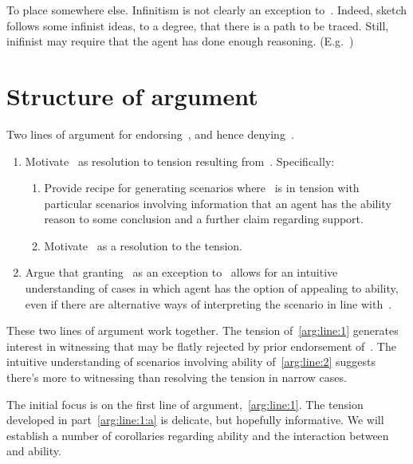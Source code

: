 \begin{note}
  {
    \color{red}
    To place somewhere else.
  }
  Infinitism is not clearly an exception to~\uRa{}.
  Indeed, sketch follows some infinist ideas, to a degree, that there is a path to be traced.
  Still, inifinist may require that the agent has done enough reasoning.
  (E.g.\ \textcite[10]{Klein:2007ve})
\end{note}

\newpage

\section{Structure of argument}
\label{sec:structure-argument}

\begin{note}
  Two lines of argument for endorsing~\rC{}, and hence denying~\uRa{}.
  \begin{enumerate}[label=(L\arabic*), ref=(L\arabic*)]
  \item\label{arg:line:1} Motivate~\rC{} as resolution to tension resulting from~\uRa{}.\newline
    Specifically:
    \begin{enumerate}[label=(L1\alph*)]
    \item\label{arg:line:1:a} Provide recipe for generating scenarios where~\uRa{} is in tension with particular scenarios involving information that an agent has the ability reason to some conclusion and a further claim regarding support.
    \item\label{arg:line:1:b} Motivate~\rC{} as a resolution to the tension.
    \end{enumerate}
  \item\label{arg:line:2} Argue that granting~\rC{} as an exception to~\uRa{} allows for an intuitive understanding of cases in which agent has the option of appealing to ability, even if there are alternative ways of interpreting the scenario in line with~\uRa{}.
  \end{enumerate}
  These two lines of argument work together.
  The tension of~\ref{arg:line:1} generates interest in witnessing that may be flatly rejected by prior endorsement of~\uRa{}.
  The intuitive understanding of scenarios involving ability of~\ref{arg:line:2} suggests there's more to witnessing than resolving the tension in narrow cases.
\end{note}

\begin{note}
  The initial focus is on the first line of argument,~\ref{arg:line:1}.
  The tension developed in part~\ref{arg:line:1:a} is delicate, but hopefully informative.
  We will establish a number of corollaries regarding ability and the interaction between~\uRa{} and ability.
\end{note}

